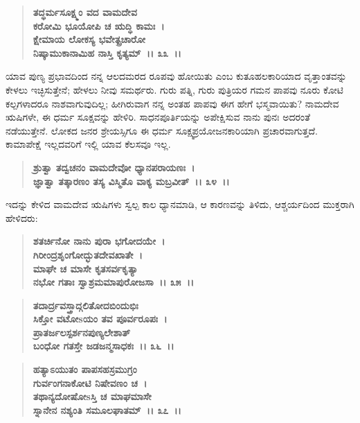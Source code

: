 \begin{verse}
\textbf{ತದ್ಧರ್ಮಸೂಕ್ಷ್ಮಂ ವದ ವಾಮದೇವ}\\\textbf{ಕರೋಮಿ ಭೂಯೋಪಿ ಚ ಋದ್ಧಿ ಕಾಮಃ~। }\\\textbf{ಕ್ಷೇಮಾಯ ಲೋಕಸ್ಯ ಭವೇತ್ಪ್ರಚಾರೋ} \\\textbf{ನಿಷ್ಕಾಮುಕಾನಾಮಿಹ ನಾಸ್ತಿ ಕೃತ್ಯಮ್~।। ೩೩~।।}
\end{verse}

ಯಾವ ಪುಣ್ಯ ಪ್ರಭಾವದಿಂದ ನನ್ನ ಆಲದಮರದ ರೂಪವು ಹೋಯಿತು ಎಂಬ ಕುತೂಹಲಕಾರಿಯಾದ ವೃತ್ತಾಂತವನ್ನು ಕೇಳಲು ಇಚ್ಛಿಸುತ್ತೇನೆ; ಹೇಳಲು ನೀವು ಸಮರ್ಥರು. ಗುರು ಪತ್ನಿ, ಗುರು ಪುತ್ರಿಯರ ಗಮನ ಪಾಪವು ನೂರು ಕೋಟಿ ಕಲ್ಪಗಳಾದರೂ ನಾಶವಾಗುವುದಿಲ್ಲ; ಹೀಗಿರುವಾಗ ನನ್ನ ಅಂತಹ ಪಾಪವು ಈಗ ಹೇಗೆ ಭಸ್ಮವಾಯಿತು? ನಾಮದೇವ ಋಷಿಗಳೇ, ಈ ಧರ್ಮ ಸೂಕ್ಷವನ್ನು ಹೇಳಿರಿ. ಸಾಧನಪೂರ್ತಿಯನ್ನು ಅಪೇಕ್ಷಿಸುವ ನಾನು ಪುನಃ ಅದರಂತೆ ನಡೆಯುತ್ತೇನೆ. ಲೋಕದ ಜನರ ಶ್ರೇಯಸ್ಸಿಗೂ ಈ ಧರ್ಮ ಸೂಕ್ಷ್ಮಪ್ರಯೋಜನಕಾರಿಯಾಗಿ ಪ್ರಚಾರವಾಗುತ್ತದೆ. ಕಾಮಾಪೇಕ್ಷೆ ಇಲ್ಲದವರಿಗೆ ಇಲ್ಲಿ ಯಾವ ಕೆಲಸವೂ ಇಲ್ಲ.

\begin{verse}
\textbf{ಶ್ರುತ್ವಾ ತದ್ವಚನಂ ವಾಮದೇವೋ ಧ್ಯಾನಪರಾಯಣಃ~।}\\\textbf{ಜ್ಞಾತ್ವಾ ತತ್ಕಾರಣಂ ತಸ್ಯ ವಿಸ್ಮಿತೊ ವಾಕ್ಯ ಮಬ್ರವೀತ್~।। ೩೪~।।}
\end{verse}

ಇದನ್ನು ಕೇಳಿದ ವಾಮದೇವ ಋಷಿಗಳು ಸ್ವಲ್ಪ ಕಾಲ ಧ್ಯಾನಮಾಡಿ, ಆ ಕಾರಣವನ್ನು ತಿಳಿದು, ಆಶ್ಚರ್ಯದಿಂದ ಮುಕ್ತರಾಗಿ ಹೇಳಿದರು:

\begin{verse}
\textbf{ಶತರ್ಚಿನೋ ನಾನು ಪುರಾ ಭಗೋದಯೇ~।}\\\textbf{ಗಿರೀಂದ್ರಶೃಂಗೋದ್ಭುತದೇವಖಾತೇ~। }\\\textbf{ಮಾಘೇ ಚ ಮಾಸೇ ಕೃತಸರ್ವಕೃತ್ಯಾ} \\\textbf{ನಭೋ ಗತಾಃ ಸ್ವಾಶ್ರಮಮಾಪುರೋಜಸಾ~।। ೩೫~।। }
\end{verse}

\begin{verse}
\textbf{ತದಾರ್ದ್ರವಸ್ತ್ರಾದ್ಗಲಿತೋದಬಿಂದುಭಿಃ}\\\textbf{ಸಿಕ್ತೋ ವಟೋsಯಂ ತವ ಪೂರ್ವರೂಪಃ~। }\\\textbf{ಪ್ರಾತರ್ಜಲಸ್ಪರ್ಶನಪುಣ್ಯಲೇಶಾತ್} \\\textbf{ಬಂಧೋ ಗತಸ್ತೇ ಜಡಜನ್ಮಸಾಧಕಃ~।। ೩೬~।।}
\end{verse}

\begin{verse}
\textbf{ಹತ್ಯಾಽಯುತಂ ಪಾಪಸಹಸ್ರಮುಗ್ರಂ}\\\textbf{ಗುರ್ವಂಗನಾಕೋಟಿ ನಿಷೇವಣಂ ಚ~।}\\\textbf{ತಥಾನ್ಯದೋಷೋsಸ್ತಿ ಚ ಮಾಘಮಾಸೇ} \\\textbf{ಸ್ನಾನೇನ ನಶ್ಯಂತಿ ಸಮೂಲಘಾತಮ್~।। ೩೭~।।}
\end{verse}


